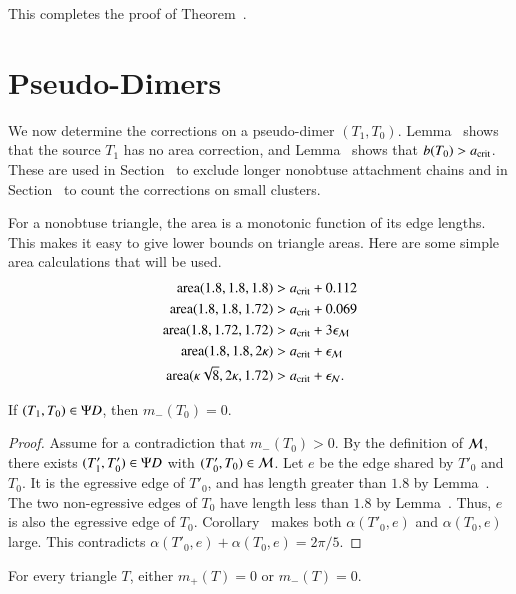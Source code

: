 This completes the proof of Theorem~.

\section{Pseudo-Dimers}

We now determine the corrections on a pseudo-dimer $(T_1,T_0)$.
Lemma~ shows that the source $T_1$ has no area correction,
and Lemma~ shows that $b(T_0)>a_\text{crit}$.  These are
used in Section~ to exclude longer nonobtuse
attachment chains and in Section~ to count the
corrections on small clusters.

For a nonobtuse triangle, the area is a monotonic function of its edge
lengths.  This makes it easy to give lower bounds on triangle areas.
Here are some simple area calculations that will be used.
\begin{align*}
{\operatorname{area}}(1.8,1.8,1.8) &> a_\text{crit} + 0.112\\
{\operatorname{area}}(1.8,1.8,1.72) &> a_\text{crit} + 0.069\\
{\operatorname{area}}(1.8,1.72,1.72) &> a_\text{crit} + 3\epsilon_{\mathcal M}\\
{\operatorname{area}}(1.8,1.8,2\kappa) &> a_\text{crit} + \epsilon_{\mathcal M}\\
{\operatorname{area}}(\kappa\sqrt8,2\kappa,1.72) &> a_\text{crit} +\epsilon_{\mathcal N}.
\end{align*}

\begin{lemma}  
If $(T_1,T_0)\in\Psi D$, then $m_-(T_0)=0$.
\end{lemma}

\begin{proof} 
  Assume for a contradiction that $m_-(T_0)>0$.  By the definition
  of $\mathcal M$, there exists $(T'_1,T'_0)\in\Psi D$ with
  $(T'_0,T_0)\in\mathcal M$.  Let $e$ be the edge shared by $T'_0$ and
  $T_0$.  It is the egressive edge of $T'_0$, and has length greater
  than $1.8$ by Lemma~.  The two non-egressive
  edges of $T_0$ have length less than $1.8$ by
  Lemma~.  Thus, $e$ is also the egressive edge
  of $T_0$.  Corollary~ makes both
  $\alpha(T'_0,e)$ and $\alpha(T_0,e)$ large.  This contradicts
  $\alpha(T'_0,e)+\alpha(T_0,e)=2\pi/5$.
\end{proof}

\begin{corollary}  
  For every triangle $T$, either $m_+(T)=0$ or $m_-(T)=0$.
\end{corollary}

